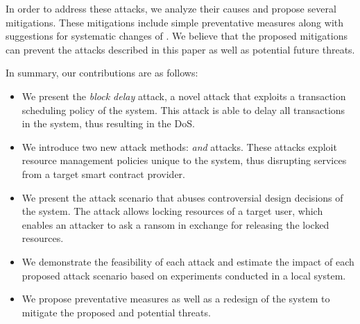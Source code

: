 In order to address these attacks, we analyze their causes and propose several
mitigations. These mitigations include simple preventative measures along with
suggestions for systematic changes of \eos. We believe that the proposed
mitigations can prevent the attacks described in this paper as well as potential
future threats.

In summary, our contributions are as follows:
\begin{itemize}
\item We present the \emph{block delay} attack, a novel attack that exploits
    a transaction scheduling policy of the \eos system. This attack is able
    to delay all transactions in the system, thus resulting in the DoS.
\item We introduce two new attack methods: \emph{\TESER and \SCPDOS} attacks.
    These attacks exploit resource management policies unique to the system,
    thus disrupting services from a target smart contract provider.
\item We present the \emph{\TOCTOU} attack scenario that abuses controversial
    design decisions of the system. The attack allows locking \ram resources
    of a target user, which enables an attacker to ask a ransom in exchange for
    releasing the locked \ram resources.
\item We demonstrate the feasibility of each attack and estimate the impact of
    each proposed attack scenario based on experiments conducted in a local \eos
    system.
\item We propose preventative measures as well as a redesign of the \eos system
    to mitigate the proposed and potential threats.
\end{itemize}

